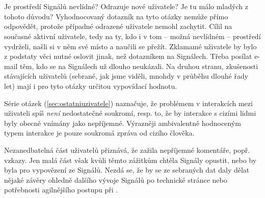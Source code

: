 \section{}

Je prostředí Signálů nevlídné? Odrazuje nové uživatele?
Je tu málo mladých z tohoto důvodu?
Vyhodnocovaný dotazník na tyto otázky nemůže přímo odpovědět,
protože případné odrazené uživatele nemohl zachytit. Cílil
na současné aktivní uživatele, tedy na ty, kdo i v tom -- možná
nevlídném -- prostředí vydrželi, našli si v něm své místo
a naučili se přežít. Zklamamé uživatele by bylo z podstaty věci
nutné oslovit jinak, než dotazníkem na Signálech. Třeba posílat
e-mail těm, kdo se na Signálech už dlouho neukázali.
Na druhou stranu, zkušenosti stávajících uživatelů
(sebrané, jak jsme viděli, mnohdy v průběhu dlouhé řady let)
mají i pro tyto otázky určitou vypovídací hodnotu.

Série otázek  (\ref{sec:ostatniuzivatele})
naznačuje, že problémem v interakcích mezi uživateli
spíš \emph{není} nedostatečné soukromí, resp. to, že by interakce
s cizími lidmi byly obecně vnímány jako nepříjemné.
Výrazněji ambivalentně hodnoceným typem interakce je pouze
soukromá zpráva od cizího člověka.

Nezanedbatelná část uživatelů přiznává, že zažila nepříjemné
komentáře, popř. vzkazy. Jen malá část však kvůli těmto
zážitkům chtěla Signály opustit, nebo by byla pro vypovězení
 ze Signálů. Nezdá se, že by se ze sebraných dat
daly dělat nějaké závěry ohledně dalšího vývoje Signálů po technické
stránce nebo potřebnosti agilnějšího postupu při .
